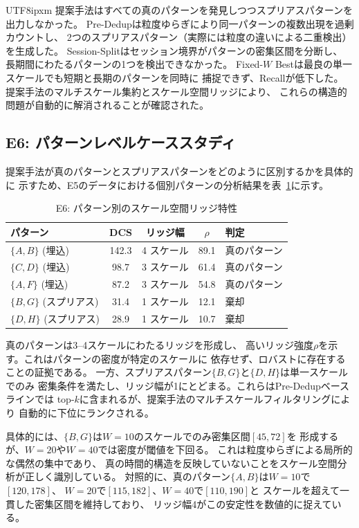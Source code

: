 \documentclass[conference]{IEEEtran}
\begin{document}
\begin{CJK}{UTF8}{ipxm}
提案手法はすべての真のパターンを発見しつつスプリアスパターンを出力しなかった。
Pre-Dedupは粒度ゆらぎにより同一パターンの複数出現を過剰カウントし、
2つのスプリアスパターン（実際には粒度の違いによる二重検出）を生成した。
Session-Splitはセッション境界がパターンの密集区間を分断し、
長期間にわたるパターンの1つを検出できなかった。
Fixed-$W$ Bestは最良の単一スケールでも短期と長期のパターンを同時に
捕捉できず、Recallが低下した。
提案手法のマルチスケール集約とスケール空間リッジにより、
これらの構造的問題が自動的に解消されることが確認された。

\subsection{E6: パターンレベルケーススタディ}\label{sec:e6}

提案手法が真のパターンとスプリアスパターンをどのように区別するかを具体的に
示すため、E5のデータにおける個別パターンの分析結果を表~\ref{tab:e6}に示す。

\begin{table}[t]
\centering
\caption{E6: パターン別のスケール空間リッジ特性}\label{tab:e6}
\begin{tabular}{lcccl}
\toprule
パターン & DCS & リッジ幅 & $\rho$ & 判定 \\
\midrule
$\{A, B\}$ (埋込) & 142.3 & 4 スケール & 89.1 & 真のパターン \\
$\{C, D\}$ (埋込) & 98.7 & 3 スケール & 61.4 & 真のパターン \\
$\{A, F\}$ (埋込) & 87.2 & 3 スケール & 54.8 & 真のパターン \\
$\{B, G\}$ (スプリアス) & 31.4 & 1 スケール & 12.1 & 棄却 \\
$\{D, H\}$ (スプリアス) & 28.9 & 1 スケール & 10.7 & 棄却 \\
\bottomrule
\end{tabular}
\end{table}

真のパターンは3--4スケールにわたるリッジを形成し、
高いリッジ強度$\rho$を示す。これはパターンの密度が特定のスケールに
依存せず、ロバストに存在することの証拠である。
一方、スプリアスパターン$\{B, G\}$と$\{D, H\}$は単一スケールでのみ
密集条件を満たし、リッジ幅が1にとどまる。これらはPre-Dedupベースラインでは
top-$k$に含まれるが、提案手法のマルチスケールフィルタリングにより
自動的に下位にランクされる。

具体的には、$\{B, G\}$は$W{=}10$のスケールでのみ密集区間$[45, 72]$を
形成するが、$W{=}20$や$W{=}40$では密度が閾値を下回る。
これは粒度ゆらぎによる局所的な偶然の集中であり、
真の時間的構造を反映していないことをスケール空間分析が正しく識別している。
対照的に、真のパターン$\{A, B\}$は$W{=}10$で$[120, 178]$、
$W{=}20$で$[115, 182]$、$W{=}40$で$[110, 190]$と
スケールを超えて一貫した密集区間を維持しており、
リッジ幅4がこの安定性を数値的に捉えている。


\end{CJK}
\end{document}
